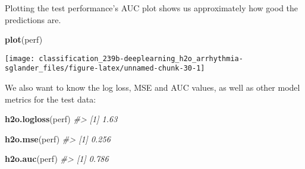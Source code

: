 \documentclass[]{book}
\newenvironment{Shaded}{\begin{snugshade}}{\end{snugshade}}
\newcommand{\CommentTok}[1]{\textcolor[rgb]{0.56,0.35,0.01}{\textit{#1}}}
\newcommand{\KeywordTok}[1]{\textcolor[rgb]{0.13,0.29,0.53}{\textbf{#1}}}
\newcommand{\NormalTok}[1]{#1}
\begin{document}
Plotting the test performance's AUC plot shows us approximately how good the predictions are.

\begin{Shaded}
\begin{Highlighting}[]
\KeywordTok{plot}\NormalTok{(perf)}
\end{Highlighting}
\end{Shaded}

\begin{center}\texttt{[image: classification\_239b-deeplearning\_h2o\_arrhythmia-sglander\_files/figure-latex/unnamed-chunk-30-1]} \end{center}

We also want to know the log loss, MSE and AUC values, as well as other model metrics for the test data:

\begin{Shaded}
\begin{Highlighting}[]
\KeywordTok{h2o.logloss}\NormalTok{(perf)}
\CommentTok{#> [1] 1.63}
\end{Highlighting}
\end{Shaded}

\begin{Shaded}
\begin{Highlighting}[]
\KeywordTok{h2o.mse}\NormalTok{(perf)}
\CommentTok{#> [1] 0.256}
\end{Highlighting}
\end{Shaded}

\begin{Shaded}
\begin{Highlighting}[]
\KeywordTok{h2o.auc}\NormalTok{(perf)}
\CommentTok{#> [1] 0.786}
\end{Highlighting}
\end{Shaded}
\end{document}
